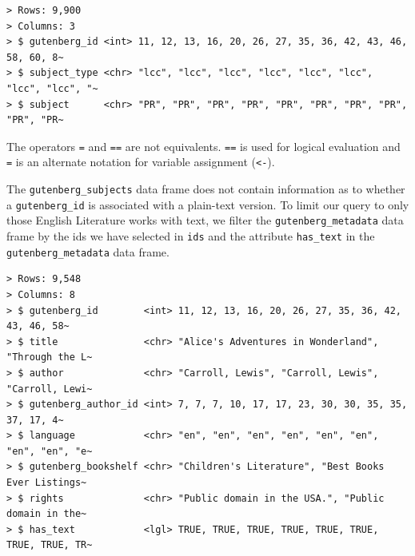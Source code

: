\documentclass[
  letterpaper,
]{latex/krantz}
\newenvironment{Shaded}{\begin{snugshade}}{\end{snugshade}}
\newcommand{\CommentTok}[1]{\textcolor[rgb]{0.00,0.00,0.00}{\textit{#1}}}
\newcommand{\ConstantTok}[1]{\textcolor[rgb]{0.00,0.00,0.00}{#1}}
\newcommand{\FunctionTok}[1]{\textcolor[rgb]{0.00,0.00,0.00}{#1}}
\newcommand{\NormalTok}[1]{\textcolor[rgb]{0.00,0.00,0.00}{#1}}
\newcommand{\OtherTok}[1]{\textcolor[rgb]{0.00,0.00,0.00}{#1}}
\newcommand{\SpecialCharTok}[1]{\textcolor[rgb]{0.00,0.00,0.00}{#1}}
\begin{document}
\begin{verbatim}
> Rows: 9,900
> Columns: 3
> $ gutenberg_id <int> 11, 12, 13, 16, 20, 26, 27, 35, 36, 42, 43, 46, 58, 60, 8~
> $ subject_type <chr> "lcc", "lcc", "lcc", "lcc", "lcc", "lcc", "lcc", "lcc", "~
> $ subject      <chr> "PR", "PR", "PR", "PR", "PR", "PR", "PR", "PR", "PR", "PR~
\end{verbatim}

\begin{tcolorbox}[enhanced jigsaw, colframe=quarto-callout-warning-color-frame, titlerule=0mm, coltitle=black, colback=white, opacitybacktitle=0.6, colbacktitle=quarto-callout-warning-color!10!white, left=2mm, arc=.35mm, leftrule=.75mm, rightrule=.15mm, bottomtitle=1mm, toptitle=1mm, breakable, bottomrule=.15mm, title=\textcolor{quarto-callout-warning-color}{\faExclamationTriangle}\hspace{0.5em}{Tip}, toprule=.15mm, opacityback=0]

The operators \texttt{=} and \texttt{==} are not equivalents.
\texttt{==} is used for logical evaluation and \texttt{=} is an
alternate notation for variable assignment (\texttt{\textless{}-}).

\end{tcolorbox}

The \texttt{gutenberg\_subjects} data frame does not contain information
as to whether a \texttt{gutenberg\_id} is associated with a plain-text
version. To limit our query to only those English Literature works with
text, we filter the \texttt{gutenberg\_metadata} data frame by the ids
we have selected in \texttt{ids} and the attribute \texttt{has\_text} in
the \texttt{gutenberg\_metadata} data frame.

\begin{Shaded}
\end{Shaded}

\begin{verbatim}
> Rows: 9,548
> Columns: 8
> $ gutenberg_id        <int> 11, 12, 13, 16, 20, 26, 27, 35, 36, 42, 43, 46, 58~
> $ title               <chr> "Alice's Adventures in Wonderland", "Through the L~
> $ author              <chr> "Carroll, Lewis", "Carroll, Lewis", "Carroll, Lewi~
> $ gutenberg_author_id <int> 7, 7, 7, 10, 17, 17, 23, 30, 30, 35, 35, 37, 17, 4~
> $ language            <chr> "en", "en", "en", "en", "en", "en", "en", "en", "e~
> $ gutenberg_bookshelf <chr> "Children's Literature", "Best Books Ever Listings~
> $ rights              <chr> "Public domain in the USA.", "Public domain in the~
> $ has_text            <lgl> TRUE, TRUE, TRUE, TRUE, TRUE, TRUE, TRUE, TRUE, TR~
\end{verbatim}
\end{document}
